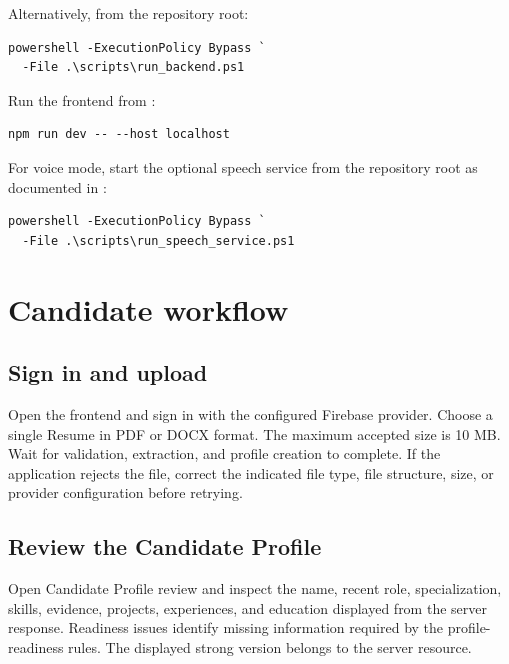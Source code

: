 Alternatively, from the repository root:

\begin{lstlisting}[language={},caption={Start the backend with the repository helper.}]
powershell -ExecutionPolicy Bypass `
  -File .\scripts\run_backend.ps1
\end{lstlisting}

Run the frontend from :

\begin{lstlisting}[language={},caption={Start the Vite frontend.}]
npm run dev -- --host localhost
\end{lstlisting}

For voice mode, start the optional speech service from the repository root as documented in :

\begin{lstlisting}[language={},caption={Start the optional speech service.}]
powershell -ExecutionPolicy Bypass `
  -File .\scripts\run_speech_service.ps1
\end{lstlisting}

\section{Candidate workflow}

\subsection{Sign in and upload}

Open the frontend and sign in with the configured Firebase provider. Choose a single Resume in PDF or DOCX format. The maximum accepted size is 10 MB. Wait for validation, extraction, and profile creation to complete. If the application rejects the file, correct the indicated file type, file structure, size, or provider configuration before retrying.

\subsection{Review the Candidate Profile}

Open Candidate Profile review and inspect the name, recent role, specialization, skills, evidence, projects, experiences, and education displayed from the server response. Readiness issues identify missing information required by the profile-readiness rules. The displayed strong version belongs to the server resource.

